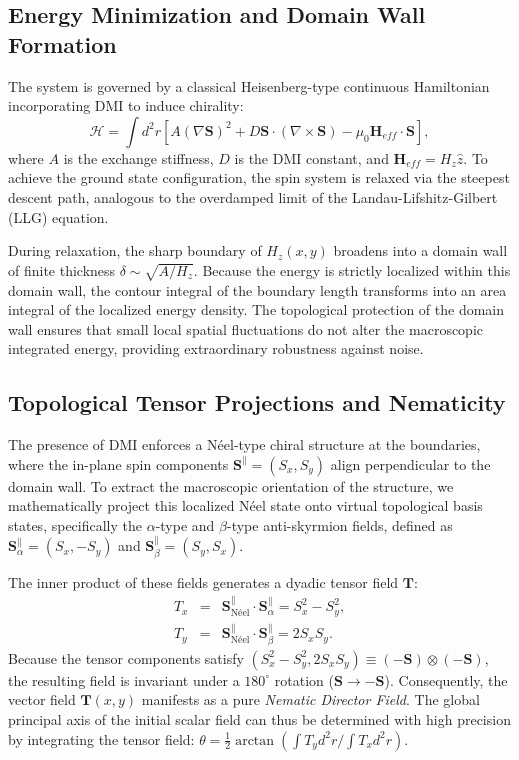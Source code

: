 \documentclass[reprint,amsmath,amssymb,aps,prapplied,longbibliography]{revtex4-2}
\begin{document}
\subsection{Energy Minimization and Domain Wall Formation}
The system is governed by a classical Heisenberg-type continuous Hamiltonian incorporating DMI to induce chirality:
\begin{equation}
\mathcal{H} = \int d^2 r \left[ A (\nabla \mathbf{S})^2 + D \mathbf{S} \cdot (\nabla \times \mathbf{S}) - \mu_0 \mathbf{H}_{eff} \cdot \mathbf{S} \right],
\end{equation}
where $A$ is the exchange stiffness, $D$ is the DMI constant, and $\mathbf{H}_{eff} = H_z \hat{z}$. To achieve the ground state configuration, the spin system is relaxed via the steepest descent path, analogous to the overdamped limit of the Landau-Lifshitz-Gilbert (LLG) equation. 

During relaxation, the sharp boundary of $H_z(x,y)$ broadens into a domain wall of finite thickness $\delta \sim \sqrt{A/H_z}$. Because the energy is strictly localized within this domain wall, the contour integral of the boundary length transforms into an area integral of the localized energy density. The topological protection of the domain wall ensures that small local spatial fluctuations do not alter the macroscopic integrated energy, providing extraordinary robustness against noise.

\subsection{Topological Tensor Projections and Nematicity}
The presence of DMI enforces a Néel-type chiral structure at the boundaries, where the in-plane spin components $\mathbf{S}^\parallel = (S_x, S_y)$ align perpendicular to the domain wall. To extract the macroscopic orientation of the structure, we mathematically project this localized Néel state onto virtual topological basis states, specifically the $\alpha$-type and $\beta$-type anti-skyrmion fields, defined as $\mathbf{S}_{\alpha}^\parallel = (S_x, -S_y)$ and $\mathbf{S}_{\beta}^\parallel = (S_y, S_x)$.

The inner product of these fields generates a dyadic tensor field $\mathbf{T}$:
\begin{eqnarray}
T_x &=& \mathbf{S}^\parallel_{\text{Néel}} \cdot \mathbf{S}^\parallel_{\alpha} = S_x^2 - S_y^2, \\
T_y &=& \mathbf{S}^\parallel_{\text{Néel}} \cdot \mathbf{S}^\parallel_{\beta} = 2S_x S_y.
\end{eqnarray}
Because the tensor components satisfy $(S_x^2 - S_y^2, 2S_x S_y) \equiv (-\mathbf{S}) \otimes (-\mathbf{S})$, the resulting field is invariant under a $180^\circ$ rotation ($ \mathbf{S} \to -\mathbf{S} $). Consequently, the vector field $\mathbf{T}(x,y)$ manifests as a pure \textit{Nematic Director Field}. The global principal axis of the initial scalar field can thus be determined with high precision by integrating the tensor field: $\theta = \frac{1}{2} \arctan (\int T_y d^2r / \int T_x d^2r)$.
\end{document}
